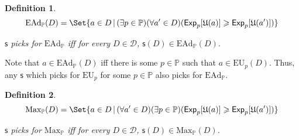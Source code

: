 \documentclass[a4paper]{article}
\newtheorem{definition}{Definition}
\renewcommand\P{\mathbb{P}} %
\newcommand\Exp{\mathsf{Exp}}
\newcommand\EU{\mathrm{EU}}
\newcommand\EAd{\mathrm{EAd}}
\newcommand\U{\mathfrak{U}} %
\newcommand\Maximality{\mathrm{Max}}
\newcommand{\D}{\mathcal{D}}
\newcommand\s{\mathsf{s}}
\newcommand{\IP}{\P}
\renewcommand{\color}[1]{}
\newenvironment{colored}[1]{\leavevmode\color{#1}}{}
\newcommand\SetDelimiter[1][]{
	\nonscript\,#1\vert \allowbreak \nonscript\,\mathopen{}}
\providecommand\given{\SetDelimiter}
\renewcommand{\geq}{\geqslant}
\newenvironment{CCM rewritten}
{\begingroup\color{blue}} %
{\endgroup}              %
\begin{document}
\begin{definition}\label{def:ead}
 $$\EAd_\IP(D) = \Set{a \in D \given (\exists p \in \IP)(\forall a' \in D)(\Exp_p[\U(a)]\geq\Exp_p[\U(a')])}$$
 
 	 $\s$ picks for $\EAd_\IP$ iff for every $D\in\D$, $\s(D)\in\EAd_\IP(D)$. 	
 \end{definition}

\begin{colored}{violet}
	 Note that	$a\in\EAd_\IP(D)$ iff there is some $p\in\IP$ such that $a\in\EU_p(D)$.  
Thus, any $\s$ which picks for $\EU_p$ for some $p\in\IP$ also picks for $\EAd_\IP$.
	
\end{colored}
	\begin{definition}
	$$\Maximality_\IP(D) = \Set{a \in D \given (\forall a'\in D)(\exists p\in\IP)(\Exp_p[\U(a)] \geq\Exp_p[\U(a')])}$$
	
		 $\s$ picks for $\Maximality_\IP$ iff for every $D\in\D$, $\s(D)\in\Maximality_\IP(D)$.
\end{definition}
\end{document}
